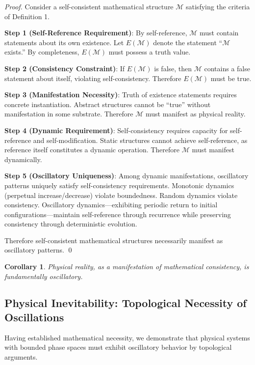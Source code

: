 \documentclass[11pt]{article}
\newtheorem{corollary}[theorem]{Corollary}
\theoremstyle{remark}
\begin{document}
\begin{proof}
Consider a self-consistent mathematical structure $\mathcal{M}$ satisfying the criteria of Definition 1.

\textbf{Step 1 (Self-Reference Requirement)}: By self-reference, $\mathcal{M}$ must contain statements about its own existence. Let $E(\mathcal{M})$ denote the statement ``$\mathcal{M}$ exists.'' By completeness, $E(\mathcal{M})$ must possess a truth value.

\textbf{Step 2 (Consistency Constraint)}: If $E(\mathcal{M})$ is false, then $\mathcal{M}$ contains a false statement about itself, violating self-consistency. Therefore $E(\mathcal{M})$ must be true.

\textbf{Step 3 (Manifestation Necessity)}: Truth of existence statements requires concrete instantiation. Abstract structures cannot be ``true'' without manifestation in some substrate. Therefore $\mathcal{M}$ must manifest as physical reality.

\textbf{Step 4 (Dynamic Requirement)}: Self-consistency requires capacity for self-reference and self-modification. Static structures cannot achieve self-reference, as reference itself constitutes a dynamic operation. Therefore $\mathcal{M}$ must manifest dynamically.

\textbf{Step 5 (Oscillatory Uniqueness)}: Among dynamic manifestations, oscillatory patterns uniquely satisfy self-consistency requirements. Monotonic dynamics (perpetual increase/decrease) violate boundedness. Random dynamics violate consistency. Oscillatory dynamics—exhibiting periodic return to initial configurations—maintain self-reference through recurrence while preserving consistency through deterministic evolution.

Therefore self-consistent mathematical structures necessarily manifest as oscillatory patterns. \qed
\end{proof}

\begin{corollary}
Physical reality, as a manifestation of mathematical consistency, is fundamentally oscillatory.
\end{corollary}

\subsection{Physical Inevitability: Topological Necessity of Oscillations}

Having established mathematical necessity, we demonstrate that physical systems with bounded phase spaces must exhibit oscillatory behavior by topological arguments.
\end{document}
